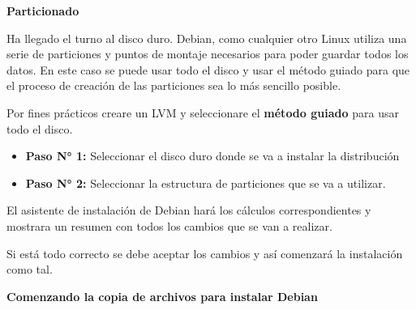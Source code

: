 				\vspace{0.3cm}
				
				\textbf{Particionado}\vspace{0.2cm}
				
				Ha llegado el turno al disco duro. Debian, como cualquier otro Linux utiliza una serie de particiones y puntos de montaje necesarios para poder guardar todos los datos. En este caso se puede usar todo el disco y usar el método guiado para que el proceso de creación de las particiones sea lo más sencillo posible.
				
				Por fines prácticos creare un LVM y seleccionare el \textbf{método guiado} para usar todo el disco.
				
				\begin{itemize}
					
					\item \textbf{Paso N° 1:} Seleccionar el disco duro donde se va a instalar la distribución
					
					\item \textbf{Paso N° 2:} Seleccionar la estructura de particiones que se va a utilizar.
					
				\end{itemize}

								
				El asistente de instalación de Debian hará los cálculos correspondientes y mostrara un resumen con todos los cambios que se van a realizar.\par			
				
				Si está todo correcto se debe aceptar los cambios y así comenzará la instalación como tal.\par
								
				\vspace{0.2cm}	
		
				\textbf{Comenzando la copia de archivos para instalar Debian}\par\vspace{0.2cm}
		
